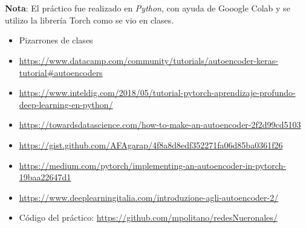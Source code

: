 \documentclass{article}
\begin{document}
\\
\


\textbf{Nota}: El práctico fue realizado en \textit{Python}, con ayuda de Gooogle Colab y se utilizo la librería Torch como se vio en clases.
    



\begin{itemize}


\item Pizarrones de clases

\item \url{https://www.datacamp.com/community/tutorials/autoencoder-keras-tutorial#autoencoders}
\item \url{https://www.inteldig.com/2018/05/tutorial-pytorch-aprendizaje-profundo-deep-learning-en-python/}
\item \url{https://towardsdatascience.com/how-to-make-an-autoencoder-2f2d99cd5103}
\item \url{https://gist.github.com/AFAgarap/4f8a8d8edf352271fa06d85ba0361f26}
\item \url{https://medium.com/pytorch/implementing-an-autoencoder-in-pytorch-19baa22647d1}
\item \url{https://www.deeplearningitalia.com/introduzione-agli-autoencoder-2/}

\item Código del práctico:  \url{https://github.com/mpolitano/redesNueronales/ }

\end{itemize}
\end{document}
